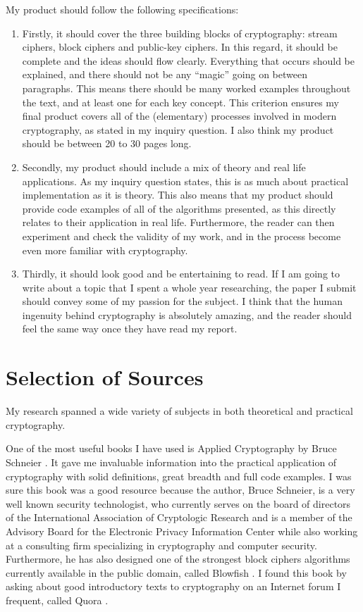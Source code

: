 \documentclass[12pt, a4paper, final]{report}
\begin{document}
My product should follow the following specifications:
\begin{enumerate}
\item Firstly, it should cover the three building blocks of cryptography:
stream ciphers, block ciphers and public-key ciphers. In this regard, it
should be complete and the ideas should flow clearly. Everything that
occurs should be explained, and there should not be any ``magic'' going
on between paragraphs. This means there should be many worked examples
throughout the text, and at least one for each key concept. This criterion
ensures my final product covers all of the (elementary) processes involved in
modern cryptography, as stated in my inquiry question. I also think my product
should be between 20 to 30 pages long.

\item Secondly, my product should include a mix of theory and real life
applications. As my inquiry question states, this is as much about
practical implementation as it is theory. This also means that my
product should provide code examples of all of the algorithms presented,
as this directly relates to their application in real life. Furthermore,
the reader can then experiment and check the validity of my work, and
in the process become even more familiar with cryptography.

\item Thirdly, it should look good and be entertaining to read. If I am
going to write about a topic that I spent a whole year researching, the paper
I submit should convey some of my passion for the subject. I think that the
human ingenuity behind cryptography is absolutely amazing, and the reader
should feel the same way once they have read my report.
\end{enumerate}

\section*{Selection of Sources}

My research spanned a wide variety of subjects in both theoretical and
practical cryptography.

One of the most useful books I have used is Applied Cryptography
by Bruce Schneier \cite{schneier}. It gave me invaluable information into the
practical application of cryptography with solid definitions,
great breadth and full code examples. I was sure this book was a good
resource because the author, Bruce Schneier, is a very well known
security technologist, who currently serves on the board of directors
of the International Association of Cryptologic Research and is a member
of the Advisory Board for the Electronic Privacy Information Center while
also working at a consulting firm specializing in cryptography and computer
security. Furthermore, he has also designed one of the strongest block
ciphers algorithms currently available in the public domain, called Blowfish
\cite{blowfish}. I found this book by asking about good introductory texts to
cryptography on an Internet forum I frequent, called Quora \cite{quora}.
\end{document}

